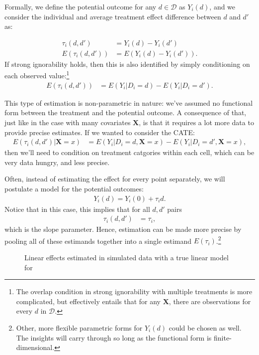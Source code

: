 \documentclass{tufte-handout}
\theoremstyle{break}
\newcommand{\bX}{\mathbf{X}}
\begin{document}
Formally, we define the potential outcome for any $d \in \mathcal{D}$ as $Y_{i}(d)$, and we consider the individual and average treatment effect difference between $d$ and $d'$ as:

\begin{align*}
    \tau_{i}(d, d') &= Y_{i}(d) - Y_{i}(d')\\
    E(\tau_{i}(d, d')) &= E(Y_{i}(d) - Y_{i}(d')).
\end{align*}
If strong ignorability holds, then this is also identified by simply conditioning on each observed value:\footnote{The overlap condition in strong ignorability with multiple treatments is more complicated, but effectively entails that for any $\bX$, there are observations for every $d$ in $\mathcal{D}.$}
\begin{align*}
  E(\tau_{i}(d, d'))  &= E(Y_{i} | D_{i} = d) - E(Y_{i} | D_{i} = d').
\end{align*}

This type of estimation is non-parametric in nature: we've assumed no functional form between the treatment and the potential outcome. A consequence of that, just like in the case with many covariates $\bX$, is that it requires a lot more data to provide precise estimates. If we wanted to consider the CATE:
\begin{align*}
  E(\tau_{i}(d, d')| \bX = x)  &= E(Y_{i} | D_{i} = d, \bX = x) - E(Y_{i} | D_{i} = d', \bX = x),
\end{align*}
then we'll need to condition on treatment catgories within each cell, which can be very data hungry, and less precise. 

Often, instead of estimating the effect for every point separately, we will postulate a model for the potential outcomes: 
\begin{align*}
  Y_{i}(d) = Y_{i}(0) + \tau_{i} d.
\end{align*}
Notice that in this case, this implies that for all $d, d'$ pairs
\begin{align*}
  \tau_{i}(d, d') &= \tau_{i},
\end{align*}
which is the slope parameter. Hence, estimation can be made more precise by pooling all of these estimands together into a single estimand $E(\tau_{i})$.\footnote{Other, more flexible parametric forms for $Y_{i}(d)$ could be chosen as well. The insights will carry through so long as the functional form is finite-dimensional.}


\begin{figure*}
  \caption{Linear effects estimated in simulated data with a true linear model for }
  \label{fig:linearmodel1}
\end{figure*}
\end{document}
